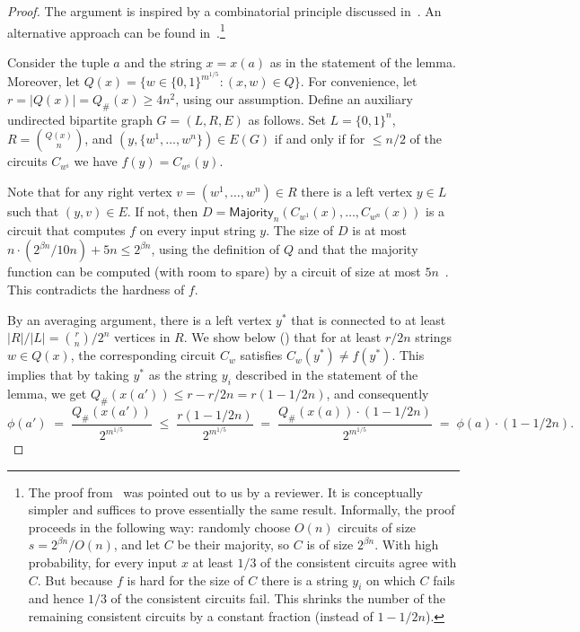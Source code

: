 \documentclass{toc}
\begin{document}
\begin{proof} The argument is inspired by a combinatorial principle discussed in~\cite{krajivcek1995extensions}. An alternative approach can be found in~\cite{DBLP:journals/jcss/BshoutyCGKT96}.\footnote{The proof from~\cite{DBLP:journals/jcss/BshoutyCGKT96} was pointed out to us by a reviewer. It is conceptually simpler and suffices to prove essentially the same result. Informally, the proof proceeds in the following way: randomly choose $O(n)$ circuits of size $s=2^{\beta n}/O(n)$, and let $C$ be their majority, so $C$ is of size $2^{\beta n}$. With high probability, for every input $x$ at least $1/3$ of the consistent circuits agree with $C$. But because $f$ is hard for the size of $C$ there is a string $y_i$ on which $C$ fails and hence $1/3$ of the consistent circuits fail. This shrinks the number of the remaining consistent circuits by a constant fraction (instead of $1-1/2n$).
}

Consider the tuple $a$ and the string $x = x(a)$ as in the statement of the lemma. Moreover, let $Q(x) =  \{ w \in \{0,1\}^{m^{1/5}} \colon (x,w) \in Q\}$. For convenience, let $r = |Q(x)| = Q_{\#}(x) \geq 4n^2$, using our assumption. Define an auxiliary undirected bipartite graph $G = (L,R,E)$ as follows. Set $L = \{0,1\}^n$, $R = \binom{Q(x)}{n}$, and $(y,\{w^1, \ldots, w^n\}) \in E(G)$ if and only if for $\leq n/2$ of the circuits $C_{w^i}$ we have $f(y) = C_{w^i}(y)$.

Note that for any right vertex $v = (w^1, \ldots, w^n) \in R$ there is a left vertex $y \in L$ such that $(y,v) \in E$. If not, then $D = \mathsf{Majority}_n(C_{w^1}(x), \ldots, C_{w^n}(x))$ is a circuit that computes $f$ on every input string $y$. The size of $D$ is at most $n \cdot (2^{\beta n}/10n) + 5n \leq 2^{\beta n}$, using the definition of $Q$ and that the majority function can be computed (with room to spare) by a circuit of size at most $5n$~\cite{DBLP:books/teu/Wegener87}. This contradicts the hardness of $f$.

By an averaging argument, there is a left vertex $y^*$ that is connected to at least $|R|/|L| = \binom{r}{n}/2^n$ vertices in $R$. We show below () that for at least $r/2n$ strings $w \in Q(x)$, the corresponding circuit $C_w$ satisfies $C_w(y^*) \neq f(y^*)$. This implies that by taking $y^*$ as the string $y_i$ described in the statement of the lemma, we get $Q_{\#}(x(a')) \leq r - r/2n = r(1 - 1/2n)$, and consequently 
$$\phi(a') \;=\; \frac{Q_{\#}(x(a'))}{2^{m^{1/5}}} \;\leq\; \frac{r(1 - 1/2n)}{2^{m^{1/5}}} \;=\; \frac{Q_{\#}(x(a))\cdot (1 - 1/2n)}{2^{m^{1/5}}} \;=\; \phi(a) \cdot (1 - 1/2n).$$


\end{proof}
\end{document}
